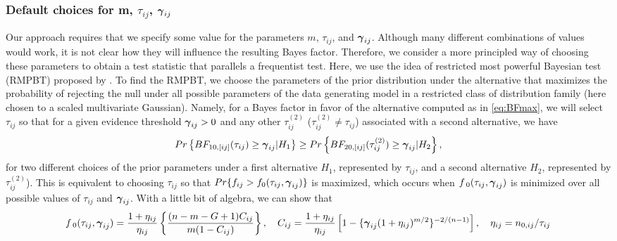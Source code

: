 \documentclass[alpha-refs]{wiley-article}
\theoremstyle{plain}%
\theoremstyle{definition}
\newcommand{\ugamma}            {\mbox{\boldmath$\gamma$}}
\begin{document}
\subsubsection{Default choices for m, $\tau_{ij}$, $\ugamma_{ij}$} \label{sec:mtaugam}
Our approach requires that we specify some value for the parameters $m$, $\tau_{ij}$, and $\ugamma_{ij}$. Although many different combinations of values would work, it is not clear how they will influence the resulting Bayes factor. Therefore, we consider a more principled way of choosing these parameters to obtain a test statistic that parallels a frequentist test.   
Here, we use the idea of restricted most powerful Bayesian test (RMPBT) proposed by \cite{GoddardJohnson,Goddard}. To find the RMPBT, we choose the parameters of the prior distribution under the alternative that maximizes the probability of rejecting the null under all possible parameters of the data generating model in a restricted class of distribution family (here chosen to a scaled multivariate Gaussian). Namely, for a Bayes factor in favor of the alternative computed as in \eqref{eq:BFmax}, we will select $\tau_{ij}$ so that for a given evidence threshold $\ugamma_{ij} > 0$ and any other $\tau^{(2)}_{ij}$ ($\tau^{(2)}_{ij} \neq \tau_{ij}$) associated with a second alternative, we have
$$Pr\left\{BF_{10,[ij]}(\tau_{ij}) \geq  \ugamma_{ij} | H_{1} \right\} \geq Pr\left\{BF_{20,[ij]}(\tau^{(2)}_{ij}) \geq \ugamma_{ij} | H_{2} \right\},$$
for two different choices of the prior parameters under a first alternative $H_1$, represented by $\tau_{ij}$, and a second alternative $H_2$, represented by $\tau^{(2)}_{ij}$). This is equivalent to choosing $\tau_{ij}$ so that $Pr\{f_{ij} > f_{0}(\tau_{ij},\ugamma_{ij})\}$ is maximized, which occurs when $f_{\;0}(\tau_{ij},\ugamma_{ij})$ is minimized over all possible values of $\tau_{ij}$ and $\ugamma_{ij}$. With a little bit of algebra, we can show that 
\begin{align*}
    f_{\;0}(\tau_{ij},\ugamma_{ij}) = \frac{1+\eta_{ij}}{\eta_{ij}} \left\{ \frac{(n - m -G+1)C_{ij}}{m(1 - C_{ij})} \right\},\quad
    C_{ij} = \frac{1+\eta_{ij}}{\eta_{ij}}\left[ 1 - \{\ugamma_{ij}(1+\eta_{ij})^{m/2} \}^{-2/(n-1)}  \right],\quad\eta_{ij} = n_{0,ij}/\tau_{ij}
\end{align*}
\end{document}
